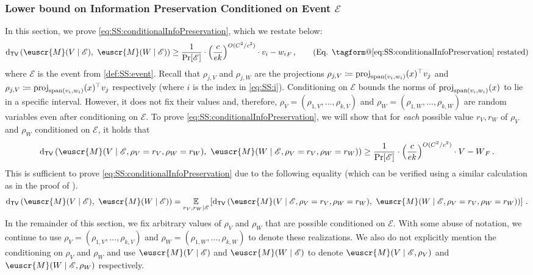 \documentclass[11pt,letterpaper]{article}
\makeatletter
\DeclareMathOperator{\proj}{proj}
\theoremstyle{plain}
\theoremstyle{definition}
\theoremstyle{remark}
\renewcommand{\eqref}[1]{\textup{\eqrefform@{\ref{#1}}}}
\let\eqrefform@\tagform@
\newcommand{\inparen}[1]{\ensuremath{\left(#1\right)}}
\newcommand{\insquare}[1]{\ensuremath{\left[#1\right]}}
\let\norm\relax
\newcommand{\norm}[1]{\ensuremath{\left\lVert #1 \right\rVert}}
\newcommand{\evE}{\ensuremath{\mathscr{E}}}
\newcommand{\E}{\operatornamewithlimits{\mathbb{E}}}
\newcommand{\Ex}{\E}
\newcommand{\tv}[2]{\operatorname{d}_{\mathsf{TV}}{\inparen{#1,#2}}}
\newcommand{\customcal}[1]{\euscr{#1}}
\newcommand{\cM}{\customcal{M}}
\makeatother
\begin{document}
{{\subsubsection{{Lower bound on Information Preservation Conditioned on Event $\evE$}}\label{sec:proofof:eq:SS:conditionalInfoPreservation}
    In this section, we prove \cref{eq:SS:conditionalInfoPreservation}, which we restate below:
    \[
        \tv{\cM(V\mid \evE)}{~\cM(W\mid \evE)} \geq 
        \frac{1}{\Pr[\evE]}
        \cdot 
        {\inparen{\frac{c}{ek}}^{{O({C^2/c^2}){}}}}
        \cdot \norm{v_i - w_i}_F\,,
        \tag{Eq. \eqref{eq:SS:conditionalInfoPreservation} restated}
    \]
    {where $\evE$ is the event from \cref{def:SS:event}.}
    Recall that $\rho_{j,V}$ and $\rho_{j,W}$ are the projections $\rho_{j,V}\coloneqq \proj_{{\rm span}(v_i,w_i)}(x)^\top v_j$ and $\rho_{j,V}\coloneqq \proj_{{\rm span}(v_i,w_i)}(x)^\top v_j$ respectively (where $i$ is the index in \cref{eq:SS:i}).
    Conditioning on $\evE$ bounds the norms of $\proj_{{\rm span}(v_i,w_i)}(x)$ to lie in a specific interval.
    However, it does not fix their values and, therefore, $\rho_V =  \inparen{\rho_{1,V}, \dots, \rho_{k,V}}$ and $\rho_W = \inparen{\rho_{1,W}, \dots, \rho_{k,W}}$ are random variables even after conditioning on $\evE$.
    To prove \cref{eq:SS:conditionalInfoPreservation}, we will show that for \textit{each} possible value $r_V,r_W$ of $\rho_V$ and $\rho_W$ conditioned on $\evE$, it holds that 
    \[
        \tv{\cM(V\mid \evE, \rho_V=r_V,\rho_W=r_W)}{~\cM(W\mid \evE, \rho_V=r_V,\rho_W=r_W)}
        \geq \frac{1}{\Pr[\evE]} \cdot 
        {\inparen{\frac{c}{ek}}^{{O({C^2/c^2}){}}}}
        \cdot \norm{V - W}_F\,. 
    \]
    This is sufficient to prove \cref{eq:SS:conditionalInfoPreservation} due to the following equality {(which can be verified using a similar calculation as in the proof of )}.
    \[
        \tv{\cM(V\mid \evE)}{~\cM(W\mid \evE)}
        =
        \Ex_{r_V,r_W\mid \evE}\insquare{
            \tv{\cM(V\mid \evE, \rho_V=r_V,\rho_W=r_W)}{~\cM(W\mid \evE, \rho_V=r_V,\rho_W=r_W)}
        }\,.
    \]
    In the remainder of this section, we fix arbitrary values of $\rho_V$ and $\rho_W$ that are possible conditioned on $\evE$.
    With some abuse of notation, we continue to use $\rho_V =  \inparen{\rho_{1,V}, \dots, \rho_{k,V}}$ and $\rho_W = \inparen{\rho_{1,W}, \dots, \rho_{k,W}}$ to denote these realizations.
    We also do not explicitly mention the conditioning on $\rho_V$ and $\rho_W$ and use $\cM(V\mid \evE)$ and $\cM(W\mid \evE)$ to denote $\cM(V\mid \evE,\rho_V)$ and $\cM(W\mid \evE,\rho_W)$ respectively.

}}
\end{document}
